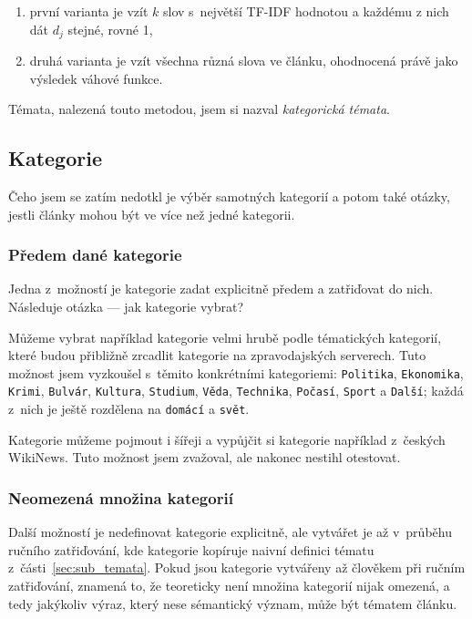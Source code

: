 \documentclass[12pt,a4paper]{report}
\begin{document}
\begin{enumerate}
    \item první varianta je vzít $k$ slov s~největší TF-IDF hodnotou a každému z nich dát $d_j$ stejné, rovné 1,
    \item druhá varianta je vzít všechna různá slova ve článku, ohodnocená právě jako výsledek váhové funkce.
\end{enumerate}

Témata, nalezená touto metodou, jsem si nazval \emph{kategorická témata}.

\subsection{Kategorie}
\label{sec:jakekategorie}
Čeho jsem se zatím nedotkl je výběr samotných kategorií a potom také otázky, jestli články mohou být ve více než jedné kategorii. %

\subsubsection{Předem dané kategorie}
\label{sec:omezene_teorie}

Jedna z~možností je kategorie zadat explicitně předem a zatřiďovat do nich. Následuje otázka --- jak kategorie vybrat?

Můžeme vybrat například kategorie velmi hrubě podle tématických kategorií, které budou přibližně zrcadlit kategorie na zpravodajských serverech. Tuto možnost jsem vyzkoušel s~těmito konkrétními kategoriemi: \texttt{Politika}, \texttt{Ekonomika}, \texttt{Krimi}, \texttt{Bulvár}, \texttt{Kultura}, \texttt{Studium}, \texttt{Věda}, \texttt{Technika}, \texttt{Počasí}, \texttt{Sport} a \texttt{Další}; každá z~nich je ještě rozdělena na \texttt{domácí} a \texttt{svět}. 

Kategorie můžeme pojmout i šířeji a vypůjčit si kategorie například z~českých WikiNews. Tuto možnost jsem zvažoval, ale nakonec nestihl otestovat.


\subsubsection{Neomezená množina kategorií}
\label{sec:neomezene_teorie}

Další možností je nedefinovat kategorie explicitně, ale vytvářet je až v~průběhu ručního zatřiďování, kde  kategorie kopíruje naivní definici tématu z~čá\-sti~\ref{sec:sub_temata}. Pokud jsou kategorie vytvářeny až člověkem při ručním zatřiďování, znamená to, že teoreticky není množina kategorií nijak omezená, a tedy jakýkoliv výraz, který nese sémantický význam, může být tématem článku.
\end{document}
